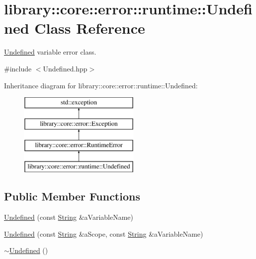 \hypertarget{classlibrary_1_1core_1_1error_1_1runtime_1_1Undefined}{}\section{library\+:\+:core\+:\+:error\+:\+:runtime\+:\+:Undefined Class Reference}
\label{classlibrary_1_1core_1_1error_1_1runtime_1_1Undefined}


\hyperlink{classlibrary_1_1core_1_1error_1_1runtime_1_1Undefined}{Undefined} variable error class.  




{\ttfamily \#include $<$Undefined.\+hpp$>$}

Inheritance diagram for library\+:\+:core\+:\+:error\+:\+:runtime\+:\+:Undefined\+:\begin{figure}[H]
\begin{center}
\leavevmode
\includegraphics[height=4.000000cm]{classlibrary_1_1core_1_1error_1_1runtime_1_1Undefined}
\end{center}
\end{figure}
\subsection*{Public Member Functions}
\begin{DoxyCompactItemize}
\item 
\hyperlink{classlibrary_1_1core_1_1error_1_1runtime_1_1Undefined_a585cecbe505147926980971fed942b95}{Undefined} (const \hyperlink{classlibrary_1_1core_1_1types_1_1String}{String} \&a\+Variable\+Name)
\item 
\hyperlink{classlibrary_1_1core_1_1error_1_1runtime_1_1Undefined_a61e341571e36a63bd0894c82b6be7427}{Undefined} (const \hyperlink{classlibrary_1_1core_1_1types_1_1String}{String} \&a\+Scope, const \hyperlink{classlibrary_1_1core_1_1types_1_1String}{String} \&a\+Variable\+Name)
\item 
\hyperlink{classlibrary_1_1core_1_1error_1_1runtime_1_1Undefined_a9069574e62bbe7aabab0519b6052cb69}{$\sim$\+Undefined} ()
\end{DoxyCompactItemize}


